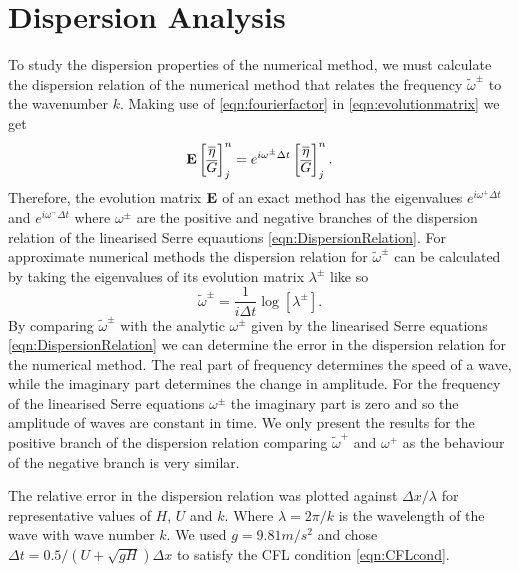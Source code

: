 \section{Dispersion Analysis}
To study the dispersion properties of the numerical method, we must calculate the dispersion relation of the numerical method  that relates the frequency $\widetilde{\omega}^\pm$ to the wavenumber $k$. Making use of \eqref{eqn:fourierfactor} in \eqref{eqn:evolutionmatrix} we get
\begin{equation}\mathbf{E}\begin{bmatrix}
\overline{\eta} \\ \overline{G}
\end{bmatrix}^{n}_j = 
e^{i \omega^\pm \Delta t}\begin{bmatrix}
\overline{\eta} \\ \overline{G}
\end{bmatrix}^{n}_j.
\label{eqn:dispanalomeganum1}
\end{equation}
Therefore, the evolution matrix $\mathbf{E}$ of an exact method has the eigenvalues $e^{i \omega^+ \Delta t}$ and $e^{i \omega^- \Delta t}$ where $\omega^\pm$ are the positive and negative branches of the dispersion relation of the linearised Serre equautions \eqref{eqn:DispersionRelation}. For approximate numerical methods the dispersion relation for $\widetilde{\omega}^\pm$ can be calculated by taking the eigenvalues of its evolution matrix $\lambda^\pm$ like so
\begin{equation*}
\widetilde{\omega}^\pm = \frac{1}{i \Delta t} \log\left[ \lambda^\pm\right].
\end{equation*}
By comparing $\widetilde{\omega}^\pm$ with the analytic $\omega^\pm$ given by the linearised Serre equations \eqref{eqn:DispersionRelation} we can determine the error in the dispersion relation for the numerical method. The real part of frequency determines the speed of a wave, while the imaginary part determines the change in amplitude. For the frequency of the linearised Serre equations $\omega^\pm$ the imaginary part is zero and so the amplitude of waves are constant in time. We only present the results for the positive branch of the dispersion relation comparing $\widetilde{\omega}^+$ and $\omega^+$ as the behaviour of the negative branch is very similar. 

The relative error in the dispersion relation was plotted against $\Delta x / \lambda$ for representative values of $H$, $U$ and $k$. Where $\lambda = 2 \pi / k$ is the wavelength of the wave with wave number $k$. We used $g = 9.81m/s^2$ and chose $\Delta t = 0.5 / \left(U + \sqrt{gH}\right) \Delta x$ to satisfy the CFL condition \eqref{eqn:CFLcond}.

